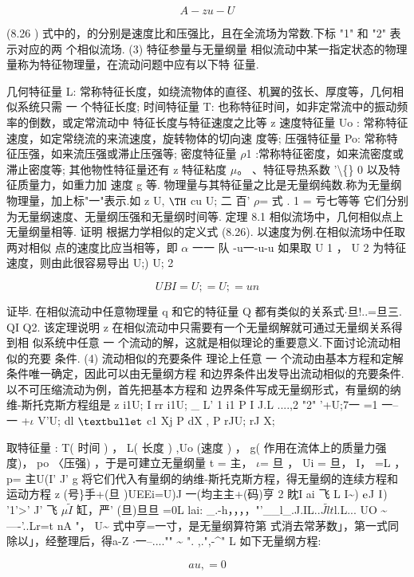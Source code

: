 \[A-z u-U\]

(8.26 ) 式中的，的分别是速度比和压强比，且在全流场为常数.下标 "1" 和 "2" 表示对应的两 个相似流场. (3) 特征参量与无量纲量 相似流动中某一指定状态的物理量称为特征物理量，在流动问题中应有以下特 征量.

几何特征量 L: 常称特征长度，如绕流物体的直径、机翼的弦长、厚度等，几何相 似系统只需 一 个特征长度; 时间特征量 T: 也称特征时间，如非定常流中的振动频率的倒数，或定常流动中 特征长度与特征速度之比等 z 速度特征量 Uo : 常称特征速度，如定常绕流的来流速度，旋转物体的切向速 度等; 压强特征量 Po: 常称特征压强，如来流压强或滞止压强等; 密度特征量 $\rho$1 :常称特征密度，如来流密度或滞止密度等; 其他物性特征量还有 z 特征粘度 $\mu$。 、特征导热系数 '\textbackslash\{\} 0 以及特征质量力，如重力加 速度 g 等. 物理量与其特征量之比是无量纲纯数.称为无量纲物理量，加上标"一"表示.如 z U, ${\rm Þ}$ cu U; 二 百' $\rho$= 式 . 1 = 亏七等等 它们分别为无量纲速度、无量纲压强和无量纲时间等. 定理 8.1 相似流场中，几何相似点上无量纲量相等. 证明 根据力学相似的定义式 (8.26). 以速度为例.在相似流场中任取两对相似 点的速度比应当相等，即 $\alpha$ 一一 队 -u一-u-u 如果取 U 1 ， U 2 为特征速度，则由此很容易导出 U;) U; 2

\[U BI =U;=U ; =un\]

证毕. 在相似流动中任意物理量 q 和它的特征量 Q 都有类似的关系式$\cdot $旦!..=旦三. QI Q2. 该定理说明 z 在相似流动中只需要有一个无量纲解就可通过无量纲关系得到相 似系统中任意 一 个流动的解，这就是相似理论的重要意义.下面讨论流动相似的充要 条件. (4) 流动相似的充要条件 理论上任意 一 个流动由基本方程和定解条件唯一确定，因此可以由无量纲方程 和边界条件出发导出流动相似的充要条件.以不可压缩流动为例，首先把基本方程和 边界条件写成无量纲形式，有量纲的纳维-斯托克斯方程组是 z i1U; I rr i1U; \_ L' 1 i1 P I J.L ....,2 "2" '+U;7一 =1 一--一 +$\iota$ V'U; dl ${\rm •}$ c1 Xj P dX , P rJU; rJ X;

取特征量 : T( 时间 ) ， L( 长度 ) ,Uo (速度 ) ， g( 作用在流体上的质量力强度)， po 〈压强) ，于是可建立无量纲量 t = 主， $\iota$= 旦 ， Ui = 旦， I， =L ， p= 主U(I' J' g 将它们代入有量纲的纳维-斯托克斯方程，得无量纲的连续方程和运动方程 z (号\}手+(旦 )UEEi=U)J 一(均主主+(码)亨 2 眈I ai 飞 L I\textasciitilde{}) ${\rm e}$J ${\rm I}$) '1'>' J' 飞 $\mu$$\tilde{I}$ 缸，严' (旦)旦旦 =0L lai: \_.-h，，，，"'\_\_l\_.J.IL..$\tilde{Jlt}$l.L... UO \textasciitilde{} ----'..Lr=t nA "， U\textasciitilde{} 式中亨=一寸，是无量纲算符第 式消去常茅数」，第一式同除以」，经整理后，得a-Z $\cdot $一--...."" \textasciitilde{} ". ,.",-\textasciicircum{}" L 如下无量纲方程:

\[au, = 0\]

